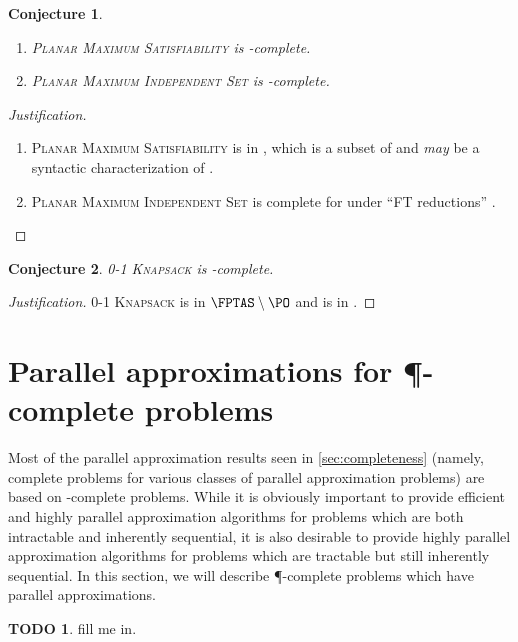 \documentclass[]{article}
\newtheorem{conjecture}{Conjecture}
\theoremstyle{definition} \newtheorem{definition}{Definition}
\theoremstyle{definition} \newtheorem{openquestion}{Open question}
\newtheorem{todo}{TODO}
\newenvironment{justification}{\begin{proof}[Justification]}{\end{proof}}
\begin{document}
\begin{conjecture}
  \mbox{}
  \begin{enumerate}
  \item \textsc{Planar Maximum Satisfiability} is \NCAS-complete.
  \item \textsc{Planar Maximum Independent Set} is \NCAS-complete.
  \end{enumerate}
\end{conjecture}
\begin{justification}
  \mbox{}
  \begin{enumerate}
  \item \textsc{Planar Maximum Satisfiability} is in \PMPSAT, which is a subset of \PTAS{} and \emph{may} be a syntactic characterization of \PTAS{} \cite{km96}.
  \item \textsc{Planar Maximum Independent Set} is complete for \PTAS{} under ``FT reductions'' \cite[Theorem~6]{bep06}.
  \end{enumerate}
\end{justification}

\begin{conjecture}
  \textsc{0-1 Knapsack} is \FNCAS-complete.
\end{conjecture}
\begin{justification}
  \textsc{0-1 Knapsack} is in $\FPTAS\setminus\PO$ \cite[Section~3.2]{ep10} and is in \FNCAS{} \cite[Theorem~2]{mayr88}.
\end{justification}

\section{Parallel approximations for \texorpdfstring{\P}{P}-complete problems}

Most of the parallel approximation results seen in \autoref{sec:completeness} (namely, complete problems for various classes of parallel approximation problems) are based on \NP-complete problems.
While it is obviously important to provide efficient and highly parallel approximation algorithms for problems which are both intractable and inherently sequential, it is also desirable to provide highly parallel approximation algorithms for problems which are tractable but still inherently sequential.
In this section, we will describe \P-complete problems which have parallel approximations.

\begin{todo}
  fill me in.
\end{todo}
\end{document}
